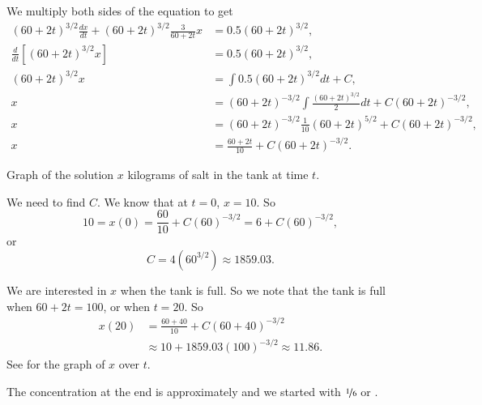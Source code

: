 \documentclass[12pt]{book}
\begin{document}
\begin{example}
We multiply both sides of the equation to get
\begin{align*}
{(60+2t)}^{3/2} \frac{dx}{dt} +
{(60+2t)}^{3/2} \frac{3}{60+2t} x
& =
0.5{(60+2t)}^{3/2} ,\\
\frac{d}{dt}\left[
{(60+2t)}^{3/2} x \right]
& =
0.5{(60+2t)}^{3/2} ,\\
{(60+2t)}^{3/2} x
& =
\int 
0.5{(60+2t)}^{3/2}
dt
+C ,\\
 x
& =
{(60+2t)}^{-3/2} \int 
\frac{
{(60+2t)}^{3/2}
}{2}
dt
+C{(60+2t)}^{-3/2} ,\\
 x
& =
{(60+2t)}^{-3/2}
\frac{1}{10}{(60+2t)}^{5/2}
+C{(60+2t)}^{-3/2} ,\\
 x
& =
\frac{60+2t}{10}
+C{(60+2t)}^{-3/2} .
\end{align*}

\begin{diffyfloatingfigurepdfonly}{3.1in}
\capstart
\begin{center}
\diffypdfversion{\vspace*{-0.4cm}}
\caption{Graph of the solution $x$ kilograms of salt in the tank at time
$t$.\label{linear-salt-graph:fig}}
\end{center}
\end{diffyfloatingfigurepdfonly}
We need to find $C$.  We know that at $t=0$, $x=10$.  So
\begin{equation*}
10 = x(0)
=
\frac{60}{10}
+C{(60)}^{-3/2}
=
6
+C{(60)}^{-3/2} ,
\end{equation*}
or
\begin{equation*}
C=4 ({60}^{3/2}) \approx 1859.03 .
\end{equation*}

We are interested in $x$ when the tank is full.  So we note that the tank is
full when $60+2t = 100$, or when $t=20$.  So
\begin{equation*}
\begin{split}
x(20) & = 
\frac{60+40}{10}
+C{(60+40)}^{-3/2}
\\
& \approx
10
+1859.03 {(100)}^{-3/2}
\approx
11.86 .
\end{split}
\end{equation*}
See  for the graph of $x$ over $t$.

The concentration at the end is approximately  and we started
with $\nicefrac{1}{6}$ or .
\end{example}
\end{document}
